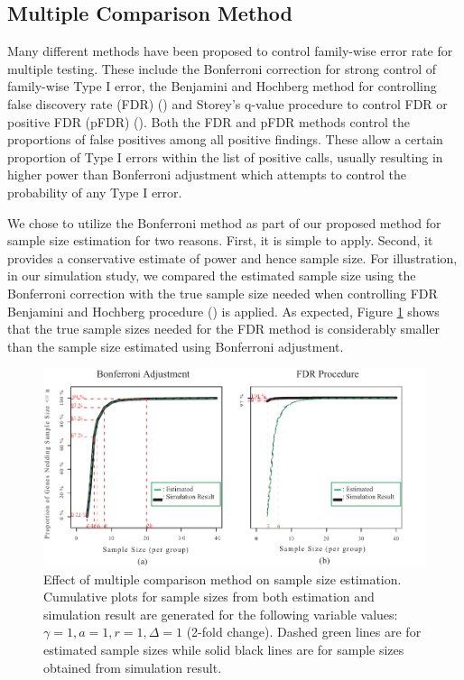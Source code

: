 \documentclass{bioinfo}
\begin{document}
\subsection{Multiple Comparison Method}

Many different methods have been proposed to control family-wise
error rate for multiple testing.  These include the Bonferroni
correction for strong control of family-wise Type I error, the
Benjamini and Hochberg method for controlling false discovery rate
(FDR) (\citealp{Benjamini95}) and Storey's q-value procedure to
control FDR or positive FDR (pFDR) (\citealp{Storey02}).  Both the
FDR and pFDR methods control the proportions of false positives
among all positive findings.  These allow a certain proportion of
Type I errors within the list of positive calls, usually resulting
in higher power than Bonferroni adjustment which attempts to
control the probability of any Type I error.

We chose to utilize the Bonferroni method as part of our proposed
method for sample size estimation for two reasons. First, it is
simple to apply.  Second, it provides a conservative estimate of
power and hence sample size.  For illustration, in our simulation
study, we compared the estimated sample size using the Bonferroni
correction with the true sample size needed when controlling FDR
Benjamini and Hochberg procedure (\citealp{Benjamini95}) is
applied. As expected, Figure \ref{fig:ResMtd} shows that the true
sample sizes needed for the FDR method is considerably smaller
than the sample size estimated using Bonferroni adjustment.

\begin{figure}[h]
  \centerline{\includegraphics*[width=3.5 in]{ResMtd.pdf}}

  \caption[Effect of multiple comparison method on sample size estimation]
  {Effect of multiple comparison method on sample size estimation.
    Cumulative plots for sample sizes from both estimation and
    simulation result are generated for the following variable values: $\gamma = 1, a = 1, r = 1,
    \Delta = 1$ (2-fold change). Dashed green lines are for estimated sample sizes
    while solid black lines are for sample sizes obtained from simulation result.}
  \label{fig:ResMtd}
\end{figure}
\end{document}
